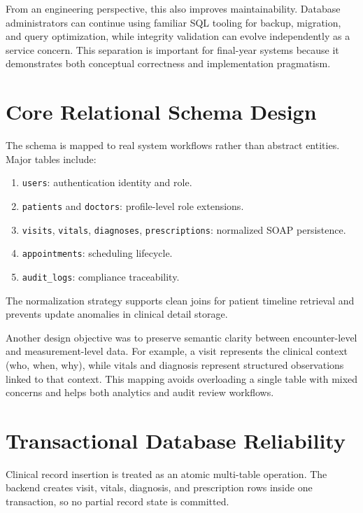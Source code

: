 \documentclass[12pt,a4paper]{report}
\begin{document}
From an engineering perspective, this also improves maintainability. Database administrators can continue using familiar SQL tooling for backup, migration, and query optimization, while integrity validation can evolve independently as a service concern. This separation is important for final-year systems because it demonstrates both conceptual correctness and implementation pragmatism.

\section{Core Relational Schema Design}

The schema is mapped to real system workflows rather than abstract entities. Major tables include:

\begin{enumerate}
\item \texttt{users}: authentication identity and role.
\item \texttt{patients} and \texttt{doctors}: profile-level role extensions.
\item \texttt{visits}, \texttt{vitals}, \texttt{diagnoses}, \texttt{prescriptions}: normalized SOAP persistence.
\item \texttt{appointments}: scheduling lifecycle.
\item \texttt{audit\_logs}: compliance traceability.
\end{enumerate}

The normalization strategy supports clean joins for patient timeline retrieval and prevents update anomalies in clinical detail storage.

Another design objective was to preserve semantic clarity between encounter-level and measurement-level data. For example, a visit represents the clinical context (who, when, why), while vitals and diagnosis represent structured observations linked to that context. This mapping avoids overloading a single table with mixed concerns and helps both analytics and audit review workflows.

\section{Transactional Database Reliability}

Clinical record insertion is treated as an atomic multi-table operation. The backend creates visit, vitals, diagnosis, and prescription rows inside one transaction, so no partial record state is committed.
\end{document}
